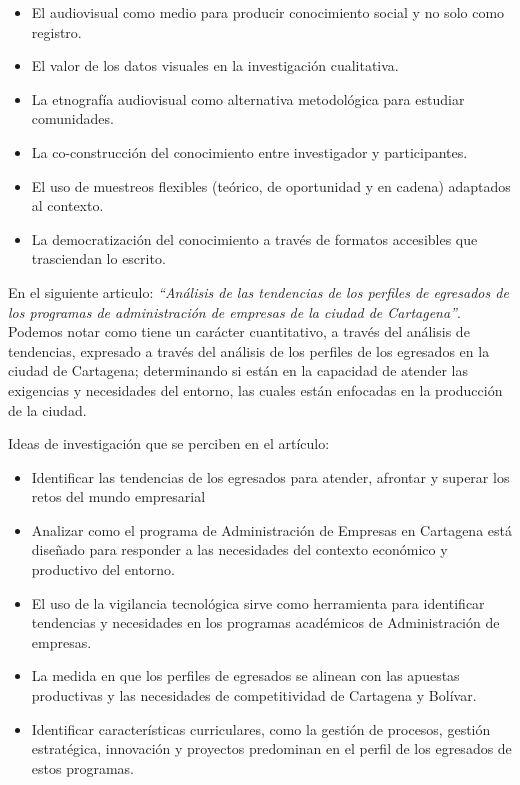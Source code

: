 \documentclass[letterpaper, 11pt]{report}
\begin{document}
\begin{itemize}
      \item El audiovisual como medio para producir conocimiento social y no solo como
            registro.
      \item El valor de los datos visuales en la investigación cualitativa.
      \item La etnografía audiovisual como alternativa metodológica para estudiar
            comunidades.
      \item La co-construcción del conocimiento entre investigador y participantes.
      \item El uso de muestreos flexibles (teórico, de oportunidad y en cadena) adaptados
            al contexto.
      \item La democratización del conocimiento a través de formatos accesibles que
            trasciendan lo escrito.
\end{itemize}

En el siguiente articulo: \textit{``Análisis de las tendencias de los perfiles
      de egresados de los programas de administración de empresas de la ciudad de
      Cartagena''}. Podemos notar como tiene un carácter cuantitativo, a través del
análisis de tendencias, expresado a través del análisis de los perfiles de los
egresados en la ciudad de Cartagena; determinando si están en la capacidad de
atender las exigencias y necesidades del entorno, las cuales están enfocadas en
la producción de la ciudad.

Ideas de investigación que se perciben en el artículo:

\begin{itemize}
      \item Identificar las tendencias de los egresados para atender, afrontar y superar
            los retos del mundo empresarial
      \item Analizar como el programa de Administración de Empresas en Cartagena está
            diseñado para responder a las necesidades del contexto económico y productivo
            del entorno.
      \item El uso de la vigilancia tecnológica sirve como herramienta para identificar
            tendencias y necesidades en los programas académicos de Administración de
            empresas.
      \item La medida en que los perfiles de egresados se alinean con las apuestas
            productivas y las necesidades de competitividad de Cartagena y Bolívar.
      \item Identificar características curriculares, como la gestión de procesos, gestión
            estratégica, innovación y proyectos predominan en el perfil de los egresados de
            estos programas.
\end{itemize}

\printbibliography
\end{document}
